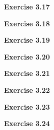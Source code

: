 \documentclass{article}
\begin{document}
\bigskip

\begin{framed}
    \noindent \textbf{Exercise 3.17}
    
    \medskip
    
    
\end{framed}

\bigskip

\begin{framed}
    \noindent \textbf{Exercise 3.18}
    
    \medskip
    
    
\end{framed}

\bigskip

\begin{framed}
    \noindent \textbf{Exercise 3.19}
    
    \medskip
    
    
\end{framed}

\bigskip

\begin{framed}
    \noindent \textbf{Exercise 3.20}
    
    \medskip
    
    
\end{framed}

\bigskip

\begin{framed}
    \noindent \textbf{Exercise 3.21}
    
    \medskip
    
    
\end{framed}

\bigskip

\begin{framed}
    \noindent \textbf{Exercise 3.22}
    
    \medskip
    
    
\end{framed}

\bigskip

\begin{framed}
    \noindent \textbf{Exercise 3.23}
    
    \medskip
    
    
\end{framed}

\bigskip

\begin{framed}
    \noindent \textbf{Exercise 3.24}
    
    \medskip
    
    
\end{framed}
\end{document}
